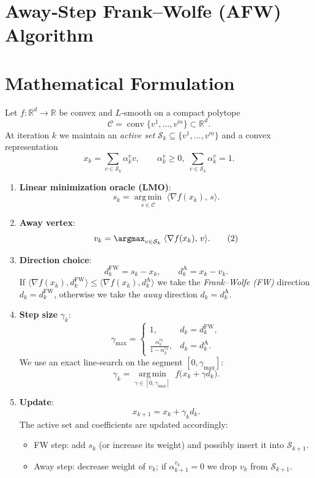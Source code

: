 \documentclass{article}
\newcommand{\R}{\mathbb{R}}
\newcommand{\C}{\mathcal{C}}
\newcommand{\argmin}{\operatorname*{arg\,min}}
\begin{document}
\section*{Away‑Step Frank–Wolfe (AFW) Algorithm}

\section*{Mathematical Formulation}
Let $f:\R^{d}\rightarrow\R$ be convex and $L$‑smooth on a compact polytope 
\[
\C = \operatorname{conv}\{v^{1},\dots ,v^{m}\}\subset\R^{d}.
\]
At iteration $k$ we maintain an \emph{active set} $\mathcal{S}_{k}\subseteq\{v^{1},\dots ,v^{m}\}$ and a convex representation
\[
x_{k}= \sum_{v\in\mathcal{S}_{k}}\alpha_{k}^{v} v ,\qquad 
\alpha_{k}^{v}\ge 0,\;\sum_{v\in\mathcal{S}_{k}}\alpha_{k}^{v}=1 .
\]

\begin{enumerate}
\item \textbf{Linear minimization oracle (LMO)}:
\[
s_{k}= \argmin_{s\in\C}\;\langle \nabla f(x_{k}),\,s\rangle .
\tag{1}
\]
\item \textbf{Away vertex}: 
\[
v_{k}= \argmax_{v\in\mathcal{S}_{k}}\;\langle \nabla f(x_{k}),\,v\rangle .
\tag{2}
\]
\item \textbf{Direction choice}:
\[
d_{k}^{\text{FW}} = s_{k}-x_{k},\qquad
d_{k}^{\text{A}}   = x_{k}-v_{k}.
\]
If $\langle \nabla f(x_{k}), d_{k}^{\text{FW}}\rangle \le \langle \nabla f(x_{k}), d_{k}^{\text{A}}\rangle$ we take the
\emph{Frank–Wolfe (FW)} direction $d_{k}=d_{k}^{\text{FW}}$,
otherwise we take the \emph{away} direction $d_{k}=d_{k}^{\text{A}}$.
\item \textbf{Step size} $\gamma_{k}$:
\[
\gamma_{\max}= 
\begin{cases}
1, & d_{k}=d_{k}^{\text{FW}},\\[4pt]
\displaystyle \frac{\alpha_{k}^{v_{k}}}{1-\alpha_{k}^{v_{k}}}, & d_{k}=d_{k}^{\text{A}}.
\end{cases}
\tag{3}
\]
We use an exact line‑search on the segment $[0,\gamma_{\max}]$:
\[
\gamma_{k}= \argmin_{\gamma\in[0,\gamma_{\max}]}\; 
f\!\bigl(x_{k}+ \gamma d_{k}\bigr).
\tag{4}
\]
\item \textbf{Update}:
\[
x_{k+1}=x_{k}+ \gamma_{k} d_{k}.
\tag{5}
\]
The active set and coefficients are updated accordingly:
\begin{itemize}
\item FW step: add $s_{k}$ (or increase its weight) and possibly insert it into $\mathcal{S}_{k+1}$.
\item Away step: decrease weight of $v_{k}$; if $\alpha_{k+1}^{v_{k}}=0$ we drop $v_{k}$ from $\mathcal{S}_{k+1}$.
\end{itemize}
\end{enumerate}
\end{document}
